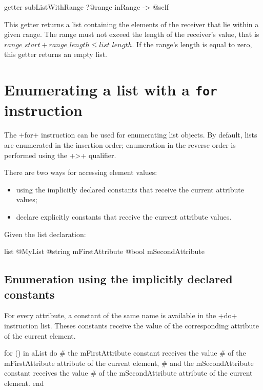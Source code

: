 \begin{galgas4}
getter subListWithRange
  ?@range inRange
  -> @self
\end{galgas4}

This getter returns a list containing the elements of the receiver that lie within a given range. The range must not exceed the length of the receiver's value, that is $range\_start + range\_length \leqslant list\_length$. If the range's length is equal to zero, this getter returns an empty list.















\section{Enumerating a list with a \texttt{for} instruction}

The \ggsq+for+ instruction can be used for enumerating list objects. By default, lists are enumerated in the insertion order; enumeration in the reverse order is performed using the \ggsq+>+ qualifier.

There are two ways for accessing element values:
\begin{itemize}
\item using the implicitly declared constants that receive the current attribute values;
\item declare explicitly constants that receive the current attribute values.
\end{itemize}

Given the list declaration:

\begin{galgas4}
list @MyList {
  @string mFirstAttribute
  @bool mSecondAttribute
}
\end{galgas4}

\subsection{Enumeration using the implicitly declared constants}

For every attribute, a constant of the same name is available in the \ggsq+do+ instruction list. Theses constants receive the value of the corresponding attribute of the current element.

\begin{galgas4}
for () in aList do
  # the mFirstAttribute constant receives the value
  # of the mFirstAttribute attribute of the current element,
  # and the mSecondAttribute constant receives the value
  # of the mSecondAttribute attribute of the current element.
end
\end{galgas4}


